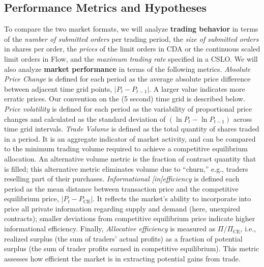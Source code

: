 \subsection{Performance Metrics and Hypotheses}\label{sect:metricHyps}
\label{sec:hypotheses}

To compare the two market formats, we will analyze \textbf{trading behavior} in terms of 
the \textit{number of submitted orders} per trading period, 
the \textit{size of submitted orders}  in shares per order,
the \textit{prices} of the limit orders in CDA or the continuous scaled limit orders in Flow, and
the \textit{maximum trading rate} specified in a CSLO.
We will also analyze \textbf{market performance} in terms of the following metrics.
\textit{Absolute Price Change} is defined for each period as the average absolute price difference between adjacent time grid points, $|P_t - P_{t-1}|$. A larger value indicates more erratic prices. 
Our convention on
the (5 second) time grid is described below. %
\textit{Price volatility} is defined for each period as the variability of proportional price changes and calculated as the standard deviation of $(\ln P_t - \ln P_{t-1})$ across time grid intervals.  %
\textit{Trade Volume} is defined  as the total quantity of shares traded in a period. It is an aggregate indicator of market activity, and can be compared to the minimum trading volume required to achieve a competitive equilibrium allocation. An alternative volume metric is the fraction of contract quantity that is filled; this alternative metric eliminates volume due to ``churn,'' e.g.,  traders reselling part of their purchases.
\textit{Informational [in]efficiency} is  defined each period as the mean distance between transaction price and the  competitive equilibrium price, \( |P_t - P_{\text{CE}}| \). It reflects the market's ability to incorporate into price all private information regarding supply and demand (here, unexpired contracts); 
smaller deviations from  competitive equilibrium price indicate higher informational efficiency.
Finally, \textit{Allocative efficiency} is measured as \( \Pi/\Pi_{\text{CE}}\), i.e.,
 realized surplus (the sum of traders' actual profits) as a fraction of potential surplus (the sum of trader profits earned in competitive equilibrium). 
This metric assesses how efficient the market is in extracting potential gains from trade.       


